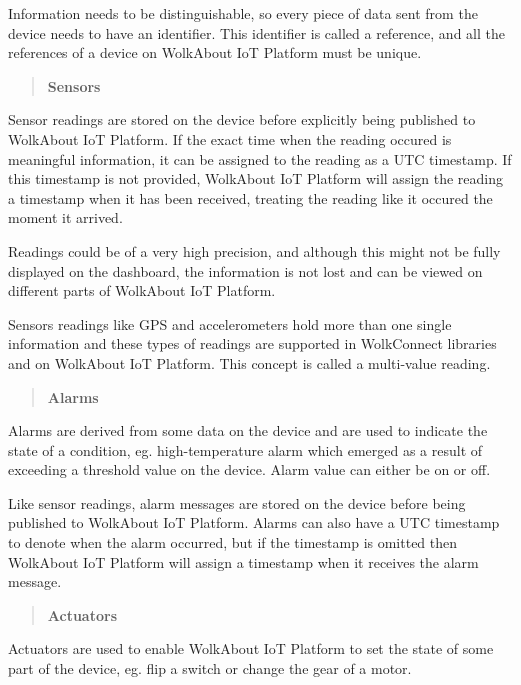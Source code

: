 Information needs to be distinguishable, so every piece of data sent from the device needs to have an identifier. This identifier is called a reference, and all the references of a device on Wolk\+About IoT Platform must be unique.

\label{_sensor-readings}%
 \begin{quote}
{\bfseries Sensors} \end{quote}


Sensor readings are stored on the device before explicitly being published to Wolk\+About IoT Platform. If the exact time when the reading occured is meaningful information, it can be assigned to the reading as a U\+TC timestamp. If this timestamp is not provided, Wolk\+About IoT Platform will assign the reading a timestamp when it has been received, treating the reading like it occured the moment it arrived.

Readings could be of a very high precision, and although this might not be fully displayed on the dashboard, the information is not lost and can be viewed on different parts of Wolk\+About IoT Platform.

Sensors readings like G\+PS and accelerometers hold more than one single information and these types of readings are supported in Wolk\+Connect libraries and on Wolk\+About IoT Platform. This concept is called a multi-\/value reading.

\label{_alarms}%
 \begin{quote}
{\bfseries Alarms} \end{quote}


Alarms are derived from some data on the device and are used to indicate the state of a condition, eg. high-\/temperature alarm which emerged as a result of exceeding a threshold value on the device. Alarm value can either be on or off.

Like sensor readings, alarm messages are stored on the device before being published to Wolk\+About IoT Platform. Alarms can also have a U\+TC timestamp to denote when the alarm occurred, but if the timestamp is omitted then Wolk\+About IoT Platform will assign a timestamp when it receives the alarm message.

\label{_actuators}%
 \begin{quote}
{\bfseries Actuators} \end{quote}


Actuators are used to enable Wolk\+About IoT Platform to set the state of some part of the device, eg. flip a switch or change the gear of a motor.

